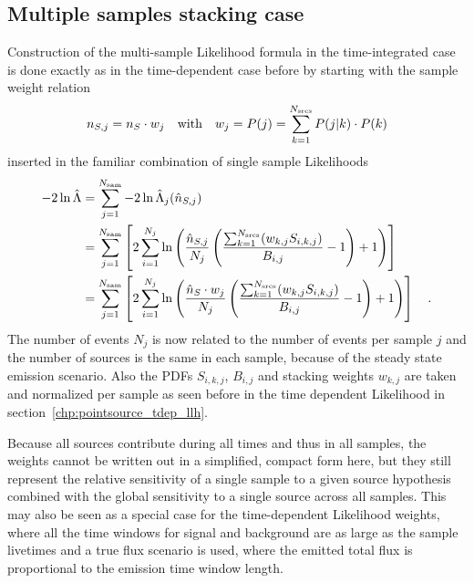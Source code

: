 \subsection{Multiple samples stacking case}
Construction of the multi-sample Likelihood formula in the time-integrated case is done exactly as in the time-dependent case before by starting with the sample weight relation
\begin{equation}
  n_{S,j} = n_S \cdot w_j
  \quad\text{with}\quad
  w_j = P(j) = \sum_{k=1}^{N_\text{srcs}} P(j|k)\cdot P(k)
\end{equation}
inserted in the familiar combination of single sample Likelihoods
\begin{align}
  -2\ln\hat{\Lambda}
  &= \sum_{j=1}^{N_\text{sam}} -2\ln\hat{\Lambda}_j(\hat{n}_{S,j}) \\
  &= \sum_{j=1}^{N_\text{sam}} \left[
      2\sum_{i=1}^{N_j} \ln\left(
        \frac{\hat{n}_{S,j}}{N_j}\left(
          \frac{\sum_{k=1}^{N_\text{srcs}}(w_{k,j} S_{i,k,j})}{B_{i,j}} - 1
        \right) + 1
      \right)
    \right] \\
  &= \sum_{j=1}^{N_\text{sam}} \left[
      2\sum_{i=1}^{N_j} \ln\left(
        \frac{\hat{n}_S \cdot w_j}{N_j}\left(
          \frac{\sum_{k=1}^{N_\text{srcs}}(w_{k,j} S_{i,k,j})}{B_{i,j}} - 1
        \right) + 1
      \right)
    \right]
  \quad\text{.}
\end{align}
The number of events $N_j$ is now related to the number of events per sample $j$ and the number of sources is the same in each sample, because of the steady state emission scenario.
Also the PDFs $S_{i,k,j}$, $B_{i,j}$ and stacking weights $w_{k,j}$ are taken and normalized per sample as seen before in the time dependent Likelihood in section~\ref{chp:pointsource_tdep_llh}.

Because all sources contribute during all times and thus in all samples, the weights cannot be written out in a simplified, compact form here, but they still represent the relative sensitivity of a single sample to a given source hypothesis combined with the global sensitivity to a single source across all samples.
This may also be seen as a special case for the time-dependent Likelihood weights, where all the time windows for signal and background are as large as the sample livetimes and a true flux scenario is used, where the emitted total flux is proportional to the emission time window length.

